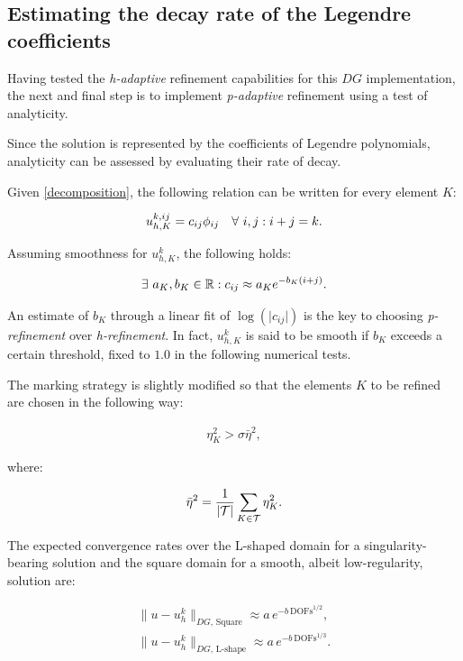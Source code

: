 \subsection{Estimating the decay rate of the Legendre coefficients}

Having tested the \textit{h-adaptive} refinement capabilities for this $DG$ implementation, the next and final step is to implement \textit{p-adaptive} refinement using a test of analyticity.

\cite{Eibner2007} Since the solution is represented by the coefficients of Legendre polynomials, analyticity can be assessed by evaluating their rate of decay.

Given \eqref{decomposition}, the following relation can be written for every element $K$:

\begin{gather}
    u^{k, ij}_{h, K} = c_{ij} \phi_{ij} \quad \forall ~ i, j : i + j = k.
\end{gather}

Assuming smoothness for $u^k_{h, K}$, the following holds:

\begin{gather}
    \exists ~ a_K, b_K \in \mathbb{R} : c_{ij} \approx a_K e^{-b_K (i + j)}.
\end{gather}

An estimate of $b_K$ through a linear fit of $\log(\lvert c_{ij} \rvert)$ is the key to choosing \textit{p-refinement} over \textit{h-refinement}. In fact, $u^k_{h, K}$ is said to be smooth if $b_K$ exceeds a certain threshold, fixed to $1.0$ in the following numerical tests.

The marking strategy is slightly modified so that the elements $K$ to be refined are chosen in the following way:

\begin{gather}
    \eta_K^2 > \sigma \bar{\eta}^2,
\end{gather}

where:

\begin{gather}
    \bar{\eta}^2 = \frac{1}{\lvert \mathcal{T} \rvert} \sum_{K \in \mathcal{T}} \eta_K^2.
\end{gather}

\cite{Eibner2007} The expected convergence rates over the L-shaped domain for a singularity-bearing solution and the square domain for a smooth, albeit low-regularity, solution are:

\begin{gather} 
    \lVert u - u^k_h \rVert_{DG, \, \text{Square}} \approx a \, e^{-b \, \text{DOFs}^{1/2}}, \label{square-hp} \\
    \lVert u - u^k_h \rVert_{DG, \, \text{L-shape}} \approx a \, e^{-b \, \text{DOFs}^{1/3}}. \label{lshape-hp}
\end{gather}

